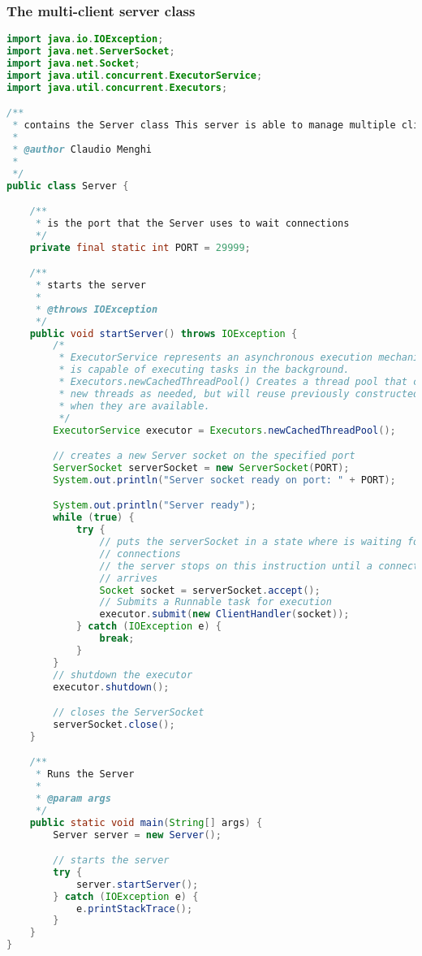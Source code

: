 \documentclass{article}
\begin{document}
\subsubsection{The multi-client server class}
\begin{lstlisting}[language=Java,escapechar=|]
import java.io.IOException;
import java.net.ServerSocket;
import java.net.Socket;
import java.util.concurrent.ExecutorService;
import java.util.concurrent.Executors;

/**
 * contains the Server class This server is able to manage multiple clients
 * 
 * @author Claudio Menghi
 * 
 */
public class Server {

	/**
	 * is the port that the Server uses to wait connections
	 */
	private final static int PORT = 29999;

	/**
	 * starts the server
	 * 
	 * @throws IOException
	 */
	public void startServer() throws IOException {
		/*
		 * ExecutorService represents an asynchronous execution mechanism which
		 * is capable of executing tasks in the background.
		 * Executors.newCachedThreadPool() Creates a thread pool that creates
		 * new threads as needed, but will reuse previously constructed threads
		 * when they are available.
		 */
		ExecutorService executor = Executors.newCachedThreadPool();

		// creates a new Server socket on the specified port
		ServerSocket serverSocket = new ServerSocket(PORT);
		System.out.println("Server socket ready on port: " + PORT);

		System.out.println("Server ready");
		while (true) {
			try {
				// puts the serverSocket in a state where is waiting for client
				// connections
				// the server stops on this instruction until a connection
				// arrives
				Socket socket = serverSocket.accept();
				// Submits a Runnable task for execution
				executor.submit(new ClientHandler(socket));
			} catch (IOException e) {
				break;
			}
		}
		// shutdown the executor
		executor.shutdown();

		// closes the ServerSocket
		serverSocket.close();
	}

	/**
	 * Runs the Server
	 * 
	 * @param args
	 */
	public static void main(String[] args) {
		Server server = new Server();

		// starts the server
		try {
			server.startServer();
		} catch (IOException e) {
			e.printStackTrace();
		}
	}
}
\end{lstlisting}
\end{document}
